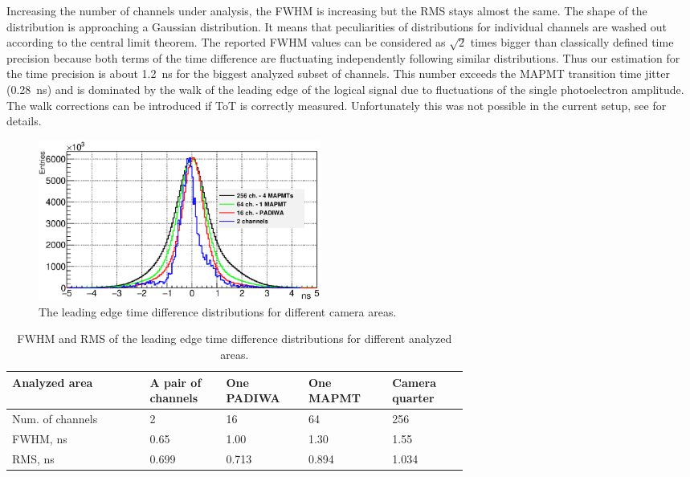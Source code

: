 \documentclass[final,5p,times,twocolumn]{elsarticle}
\begin{document}
Increasing the number of channels under analysis, the FWHM is increasing but the RMS stays almost the same. The shape of the distribution is approaching a Gaussian distribution. It means that peculiarities of distributions for individual channels are washed out according to the central limit theorem. The reported FWHM values can be considered as $ \sqrt 2 $ times bigger than classically defined time precision because both terms of the time difference are fluctuating independently following similar distributions. Thus our estimation for the time precision is about 1.2~ns for the biggest analyzed subset of channels. This number exceeds the MAPMT transition time jitter (0.28~ns) and is dominated by the walk of the leading edge of the logical signal due to fluctuations of the single photoelectron amplitude. The walk corrections can be introduced if ToT is correctly measured. Unfortunately this was not possible in the current setup, see \cite{PEPAN} for details.

\begin{figure}[tbh]
	\centering
	\includegraphics[width=0.45\textwidth]{figures/TimePrecision_evolution_laser_WLSoff_color.eps}
	\caption{The leading edge time difference distributions for different camera areas.}
	\label{fig:TimePrec}
\end{figure}

\begin{table}[tbh]
\centering
	\begin{tabular}{ | p{0.22\linewidth} | p{0.10\linewidth} | p{0.10\linewidth} | p{0.12\linewidth} | p{0.12\linewidth} | }
		\hline		
		\scriptsize{Analyzed area} & \scriptsize{A pair of channels} & \scriptsize{One PADIWA} & \scriptsize{One MAPMT} & \scriptsize{Camera quarter} \\
		\hline
		\scriptsize{Num. of channels} & 2 & 16 & 64 & 256\\
		\hline
		\scriptsize{FWHM, ns} & 0.65 & 1.00 & 1.30 & 1.55\\
		\hline
		\scriptsize{RMS, ns} & 0.699 & 0.713 & 0.894 & 1.034\\
		\hline
	\end{tabular}

	\caption{FWHM and RMS of the leading edge time difference distributions for different analyzed areas.}
	\label{tabl:TimePrecTable}

\end{table}
\end{document}
